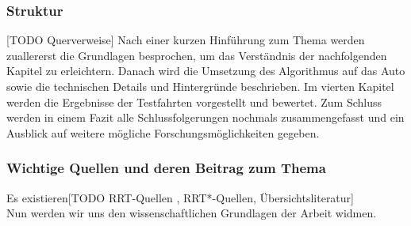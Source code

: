 \subsubsection{Struktur}
[TODO Querverweise]
Nach einer kurzen Hinführung zum Thema werden zuallererst die Grundlagen besprochen, um das Verständnis der nachfolgenden Kapitel zu erleichtern. Danach wird die Umsetzung des Algorithmus auf das Auto sowie die technischen Details und Hintergründe beschrieben. Im vierten Kapitel werden die Ergebnisse der Testfahrten vorgestellt und bewertet. Zum Schluss werden in einem Fazit alle Schlussfolgerungen nochmals zusammengefasst und ein Ausblick auf weitere mögliche Forschungsmöglichkeiten gegeben.

\subsubsection{Wichtige Quellen und deren Beitrag zum Thema}
Es existieren[TODO RRT-Quellen \citep[vgl][]{Lav98}, RRT*-Quellen, Übersichtsliteratur]
\\
Nun werden wir uns den wissenschaftlichen Grundlagen der Arbeit widmen.

